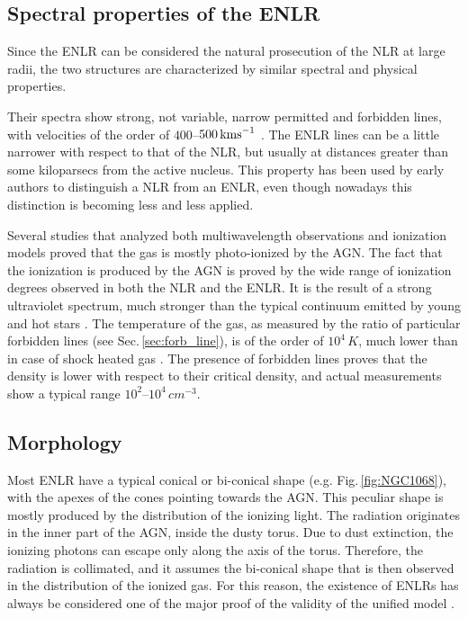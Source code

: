 \documentclass[../thesis.tex]{subfiles}
\begin{document}
\subsection{Spectral properties of the ENLR}

Since the ENLR can be considered the natural prosecution of the NLR at large radii, the two structures are characterized by similar spectral and physical properties.

Their spectra show strong, not variable, narrow permitted and forbidden lines, with velocities of the order of $400$--$500\,\si{\kms}$ \citep{Bennert04}. 
The ENLR lines can be a little narrower with respect to that of the NLR, but usually at distances greater than some kiloparsecs from the active nucleus.
This property has been used by early authors \citep[e.g.][]{Unger87} to distinguish a NLR from an ENLR, even though nowadays this distinction is becoming less and less applied.

Several studies that analyzed both multiwavelength observations and ionization models \citep[e.g.][]{Kraemer00,Kallman01} proved that the gas is mostly photo-ionized by the AGN.
The fact that the ionization is produced by the AGN is proved by the wide range of ionization degrees observed in both the NLR and the ENLR.
It is the result of a strong ultraviolet spectrum, much stronger than the typical continuum emitted by young and hot stars \citep{OsterbrockAGN}.
The temperature of the gas, as measured by the ratio of particular forbidden lines (see Sec.\,\ref{sec:forb_line}), is of the order of $10^4\,\si{K}$, much lower than in case of shock heated gas \citep[$T\sim 5\times10^4$ K][]{OsterbrockAGN}.
The presence of forbidden lines proves that the density is lower with respect to their critical density, and actual measurements show a typical range $10^2$--$10^4\,\si{cm^{-3}}$.

\subsection{Morphology}

Most ENLR have a typical conical or bi-conical shape (e.g. Fig.\,\ref{fig:NGC1068}), with the apexes of the cones pointing towards the AGN.
This peculiar shape is mostly produced by the distribution of the ionizing light.
The radiation originates in the inner part of the AGN, inside the dusty torus.
Due to dust extinction, the ionizing photons can escape only along the axis of the torus.
Therefore, the radiation is collimated, and it assumes the bi-conical shape that is then observed in the distribution of the ionized gas.
For this reason, the existence of ENLRs has always be considered one of the major proof of the validity of the unified model \citep{Wilson94,Schmitt03b,He18}.
\end{document}
